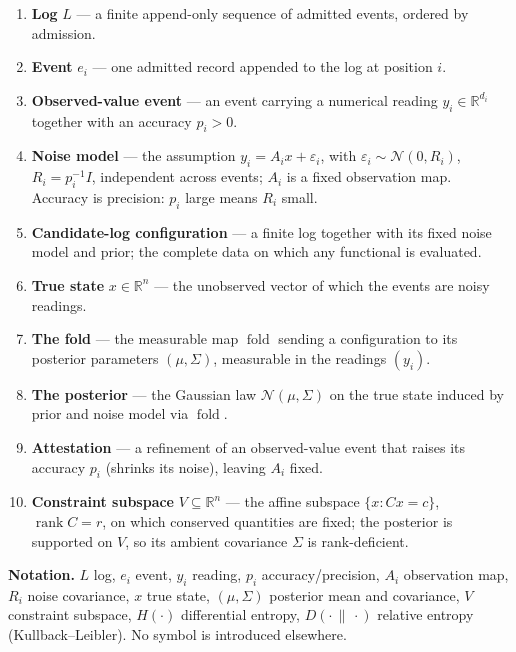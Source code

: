 \documentclass[11pt]{article}
\theoremstyle{definition}\newtheorem{definition}{Definition}
\theoremstyle{plain}\newtheorem{proposition}{Proposition}
\theoremstyle{remark}\newtheorem{remark}{Remark}
\newcommand{\Log}{L}
\newcommand{\ev}{e}                  %
\newcommand{\st}{x}                  %
\newcommand{\obs}{y}                 %
\newcommand{\acc}{p}                 %
\newcommand{\Amap}{A}                %
\newcommand{\Rcov}{R}                %
\newcommand{\mean}{\mu}
\newcommand{\cov}{\Sigma}
\newcommand{\Vsub}{V}                %
\newcommand{\Ent}{H}                 %
\newcommand{\KL}{D}                  %
\newcommand{\Ncal}{\mathcal{N}}
\DeclareMathOperator{\fold}{fold}
\begin{document}
\begin{enumerate}[leftmargin=1.4em,itemsep=0pt,topsep=2pt]
\item \textbf{Log} $\Log$ --- a finite append-only sequence of admitted events, ordered by admission.
\item \textbf{Event} $\ev_i$ --- one admitted record appended to the log at position $i$.
\item \textbf{Observed-value event} --- an event carrying a numerical reading $\obs_i\in\mathbb{R}^{d_i}$ together with an accuracy $\acc_i>0$.
\item \textbf{Noise model} --- the assumption $\obs_i=\Amap_i\st+\varepsilon_i$, with $\varepsilon_i\sim\Ncal(0,\Rcov_i)$, $\Rcov_i=\acc_i^{-1}I$, independent across events; $\Amap_i$ is a fixed observation map. Accuracy is precision: $\acc_i$ large means $\Rcov_i$ small.
\item \textbf{Candidate-log configuration} --- a finite log together with its fixed noise model and prior; the complete data on which any functional is evaluated.
\item \textbf{True state} $\st\in\mathbb{R}^n$ --- the unobserved vector of which the events are noisy readings.
\item \textbf{The fold} --- the measurable map $\fold$ sending a configuration to its posterior parameters $(\mean,\cov)$, measurable in the readings $(\obs_i)$.
\item \textbf{The posterior} --- the Gaussian law $\Ncal(\mean,\cov)$ on the true state induced by prior and noise model via $\fold$.
\item \textbf{Attestation} --- a refinement of an observed-value event that raises its accuracy $\acc_i$ (shrinks its noise), leaving $\Amap_i$ fixed.
\item \textbf{Constraint subspace} $\Vsub\subseteq\mathbb{R}^n$ --- the affine subspace $\{\st:C\st=c\}$, $\operatorname{rank}C=r$, on which conserved quantities are fixed; the posterior is supported on $\Vsub$, so its ambient covariance $\cov$ is rank-deficient.
\end{enumerate}

\noindent\textbf{Notation.} $\Log$ log, $\ev_i$ event, $\obs_i$ reading, $\acc_i$
accuracy/precision, $\Amap_i$ observation map, $\Rcov_i$ noise covariance, $\st$ true state,
$(\mean,\cov)$ posterior mean and covariance, $\Vsub$ constraint subspace, $\Ent(\cdot)$
differential entropy, $\KL(\cdot\,\|\,\cdot)$ relative entropy (Kullback--Leibler). No symbol
is introduced elsewhere.
\end{document}

